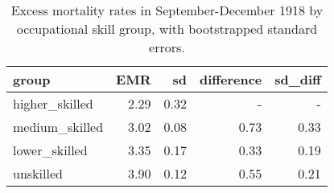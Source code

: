 \begin{table}

\caption{\label{tab:lab:emr_byskill_boot}Excess mortality rates in September-December 1918 by occupational skill group, with bootstrapped standard errors.}
\centering
\begin{tabular}[t]{l|r|r|r|r}
\hline
group & EMR & sd & difference & sd\_diff\\
\hline
higher\_skilled & 2.29 & 0.32 & - & -\\
\hline
medium\_skilled & 3.02 & 0.08 & 0.73 & 0.33\\
\hline
lower\_skilled & 3.35 & 0.17 & 0.33 & 0.19\\
\hline
unskilled & 3.90 & 0.12 & 0.55 & 0.21\\
\hline
\end{tabular}
\end{table}

